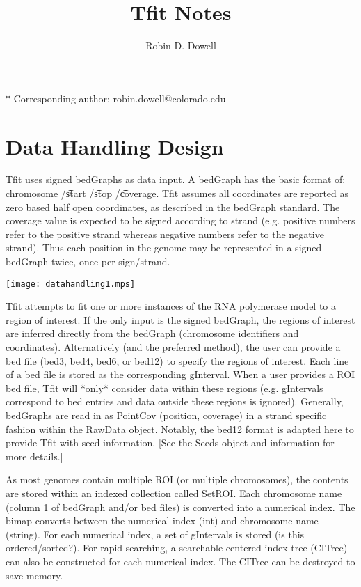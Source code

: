 \documentclass[11pt]{article}
\title{Tfit Notes}
\author{Robin D. Dowell}
\date{}
\date{ }
\begin{document}
\maketitle
\noindent $*$ Corresponding author: robin.dowell@colorado.edu

\section{Data Handling Design}
Tfit uses signed bedGraphs as data input.  A bedGraph has the basic format of: 
chromosome /\t start /\t stop /\t coverage.  Tfit assumes all coordinates are
reported as zero based half open coordinates, as described in the bedGraph standard.  
The coverage value is expected to be signed according to strand (e.g. positive 
numbers refer to the positive strand whereas negative numbers refer to the 
negative strand).  Thus each position in the genome may be represented in a 
signed bedGraph twice, once per sign/strand.

\texttt{[image: datahandling1.mps]}

Tfit attempts to fit one or more instances of the RNA polymerase model to a 
region of interest.  If the only input is the signed bedGraph, the regions of 
interest are inferred directly from the bedGraph (chromosome identifiers 
and coordinates).  Alternatively (and the preferred method), the user can 
provide a bed file (bed3, bed4, bed6, or bed12) to specify the regions of 
interest.  Each line of a bed file is stored as the corresponding gInterval.
When a user provides a ROI bed file, Tfit will *only* consider data within 
these regions (e.g. gIntervals correspond to bed entries and data outside these 
regions is ignored).  Generally, bedGraphs are read in as PointCov (position, 
coverage) in a strand specific fashion within the RawData object.  Notably,
the bed12 format is adapted here to provide Tfit with seed information.  [See
the Seeds object and information for more details.]

As most genomes contain multiple ROI (or multiple chromosomes), the contents
are stored within an indexed collection called SetROI.  Each chromosome name 
(column 1 of bedGraph and/or bed files) is converted into a numerical index.
The bimap converts between the numerical index (int) and chromosome name (string).
For each numerical index, a set of gIntervals is stored (is this ordered/sorted?). 
For rapid searching, a searchable centered index tree (CITree) can also be 
constructed for each numerical index.  The CITree can be destroyed to save 
memory.  
\end{document}
